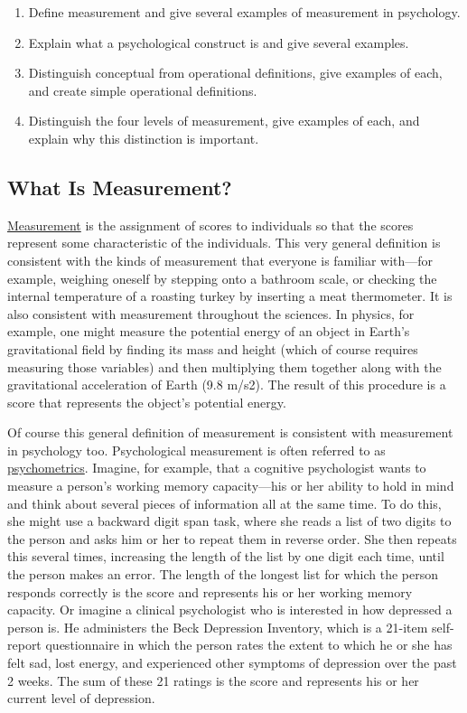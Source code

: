 \documentclass[
]{krantz}
\providecommand{\tightlist}{%
  \setlength{\itemsep}{0pt}\setlength{\parskip}{0pt}}
\begin{document}
\begin{enumerate}
\def\labelenumi{\arabic{enumi}.}
\tightlist
\item
  Define measurement and give several examples of measurement in psychology.
\item
  Explain what a psychological construct is and give several examples.
\item
  Distinguish conceptual from operational definitions, give examples of each, and create simple operational definitions.
\item
  Distinguish the four levels of measurement, give examples of each, and explain why this distinction is important.
\end{enumerate}

\subsection*{What Is Measurement?}\label{what-is-measurement}


\hyperref[measurement]{Measurement} is the assignment of scores to individuals so that the scores represent some characteristic of the individuals. This very general definition is consistent with the kinds of measurement that everyone is familiar with---for example, weighing oneself by stepping onto a bathroom scale, or checking the internal temperature of a roasting turkey by inserting a meat thermometer. It is also consistent with measurement throughout the sciences. In physics, for example, one might measure the potential energy of an object in Earth's gravitational field by finding its mass and height (which of course requires measuring those variables) and then multiplying them together along with the gravitational acceleration of Earth (9.8 m/s2). The result of this procedure is a score that represents the object's potential energy.

Of course this general definition of measurement is consistent with measurement in psychology too. Psychological measurement is often referred to as \hyperref[psychometrics]{psychometrics}. Imagine, for example, that a cognitive psychologist wants to measure a person's working memory capacity---his or her ability to hold in mind and think about several pieces of information all at the same time. To do this, she might use a backward digit span task, where she reads a list of two digits to the person and asks him or her to repeat them in reverse order. She then repeats this several times, increasing the length of the list by one digit each time, until the person makes an error. The length of the longest list for which the person responds correctly is the score and represents his or her working memory capacity. Or imagine a clinical psychologist who is interested in how depressed a person is. He administers the Beck Depression Inventory, which is a 21-item self-report questionnaire in which the person rates the extent to which he or she has felt sad, lost energy, and experienced other symptoms of depression over the past 2 weeks. The sum of these 21 ratings is the score and represents his or her current level of depression.
\end{document}

